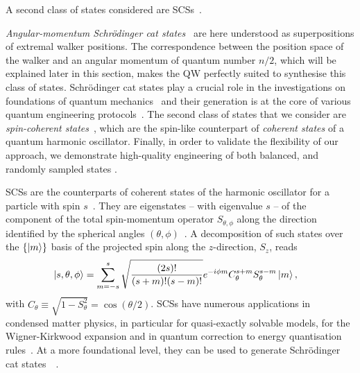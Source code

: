 A second class of states considered are \acp{SCS}~\cite{agarwal1997atomic}.



\emph{Angular-momentum Schrödinger cat states}~\cite{militello2006distilling} are here understood as superpositions of extremal walker positions. The correspondence between the position space of the walker and an angular momentum of quantum number $n/2$, which will be explained later in this section, makes the \ac{QW} perfectly suited to synthesise this class of states. Schrödinger cat states play a crucial role in the investigations on foundations of quantum mechanics~\cite{schrodinger1935gegenwartige} and their generation is at the core of various quantum engineering protocols~\cite{brune1992manipulation, monroe1996schrodinger,agarwal1997atomic, zhang2016creating}. The second class of states that we consider are \emph{spin-coherent states}~\cite{ulyanov1999spin}, which are the spin-like counterpart of \emph{coherent states} of a quantum harmonic oscillator. Finally, in order to validate the flexibility of our approach, we demonstrate high-quality engineering of both balanced, and randomly sampled states .

\acfp{SCS} are the counterparts of coherent states of the harmonic oscillator for a particle with spin $s$~\cite{radcliffe1971some,arecchi1972atomic,agarwal1997atomic,markham2003classicality}. They are eigenstates -- with eigenvalue $s$ -- of the component of the total spin-momentum operator $S_{\theta,\phi}$ along the direction identified by the spherical angles $(\theta, \phi)$~\cite{arecchi1972atomic,agarwal1997atomic,ulyanov1999spin,lee2015visualizing}.
A decomposition of such states over the $\{\ket{m}\}$ basis of the projected spin along the $z$-direction, $S_z$, reads
\begin{equation}
\begin{aligned}
	\ket{s,\theta,\phi} &=
		\sum_{m=-s}^{s}
		\sqrt{\frac{(2s)!}{(s+m)!(s-m)!}} e^{-i\phi m} C_\theta^{s+m} S_\theta^{s-m}\ket{m},
\end{aligned}
\label{spin_coherent1}
\end{equation}
with $C_\theta\equiv\sqrt{1-S^2_\theta}=\cos(\theta/2)$. \acp{SCS} have numerous applications in condensed matter physics, in particular for quasi-exactly solvable models, for the Wigner-Kirkwood expansion and in quantum correction to energy quantisation rules~\cite{ulyanov1999spin}. At a more foundational level, they can be used to generate Schrödinger cat states~~\cite{agarwal1997atomic}. 

